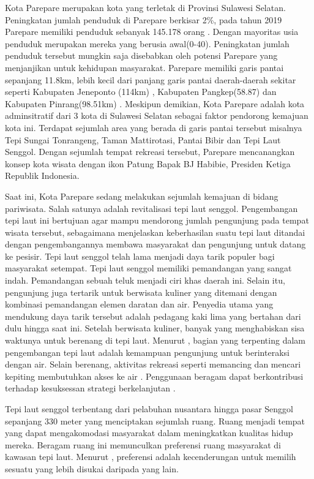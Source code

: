 \documentclass[../projects/thesis.tex]{subfiles}
\begin{document}
Kota Parepare merupakan kota yang terletak di Provinsi Sulawesi Selatan. Peningkatan jumlah penduduk di Parepare berkisar 2\%, pada tahun 2019 Parepare memiliki penduduk sebanyak 145.178 orang \citep{bpskotaparepare2020}. Dengan mayoritas usia penduduk  merupakan mereka yang berusia awal(0-40). Peningkatan jumlah penduduk tersebut mungkin saja disebabkan oleh potensi Parepare yang menjanjikan untuk kehidupan masyarakat.
Parepare memiliki garis pantai sepanjang 11.8km, lebih kecil dari panjang garis pantai daerah-daerah sekitar seperti Kabupaten Jeneponto (114km) \citep{wardasusaniati2011}, Kabupaten Pangkep(58.87) dan Kabupaten Pinrang(98.51km) \citep{goni2018}. Meskipun demikian, Kota Parepare adalah kota adminsitratif dari 3 kota di Sulawesi Selatan \citep{junaid2016} sebagai faktor pendorong kemajuan kota ini.
Terdapat sejumlah area yang berada di garis pantai tersebut misalnya Tepi Sungai Tonrangeng, Taman Mattirotasi, Pantai Bibir dan Tepi Laut Senggol.
Dengan sejumlah tempat rekreasi tersebut, Parepare mencanangkan konsep kota wisata dengan ikon Patung Bapak BJ Habibie, Presiden Ketiga Republik Indonesia.

Saat ini, Kota Parepare sedang melakukan sejumlah kemajuan di bidang pariwisata. Salah satunya adalah revitalisasi tepi laut senggol.
Pengembangan tepi laut ini bertujuan agar mampu mendorong jumlah pengunjung pada tempat wisata tersebut, sebagaimana \cite{hoyle2001} menjelaskan keberhasilan suatu tepi laut ditandai dengan pengembangannya membawa masyarakat dan pengunjung untuk datang ke pesisir.
Tepi laut senggol telah lama menjadi daya tarik populer bagi masyarakat setempat. Tepi laut senggol memiliki pemandangan yang sangat indah. Pemandangan sebuah teluk menjadi ciri khas daerah ini. Selain itu, pengunjung juga tertarik untuk berwisata kuliner yang ditemani dengan kombinasi pemandangan elemen daratan dan air. Penyedia utama yang mendukung daya tarik tersebut adalah pedagang kaki lima yang bertahan dari dulu hingga saat ini. Setelah berwisata kuliner, banyak yang menghabiskan sisa waktunya untuk berenang di tepi laut. Menurut \cite{davidowich1998}, bagian yang terpenting dalam pengembangan tepi laut adalah kemampuan pengunjung untuk berinteraksi dengan air. Selain berenang, aktivitas rekreasi seperti memancing dan mencari kepiting membutuhkan akses ke air \citep{gordon1996}. Penggunaan beragam dapat berkontribusi terhadap kesuksessan strategi berkelanjutan \citep{eldeeb2015}.

Tepi laut senggol terbentang dari pelabuhan nusantara hingga pasar Senggol sepanjang 330 meter yang menciptakan sejumlah ruang. Ruang menjadi tempat yang dapat mengakomodasi masyarakat dalam meningkatkan kualitas hidup mereka. Beragam ruang ini memunculkan preferensi ruang masyarakat di kawasan tepi laut. Menurut \cite{devysandra2012}, preferensi adalah kecenderungan untuk memilih sesuatu yang lebih disukai daripada yang lain.
\end{document}
